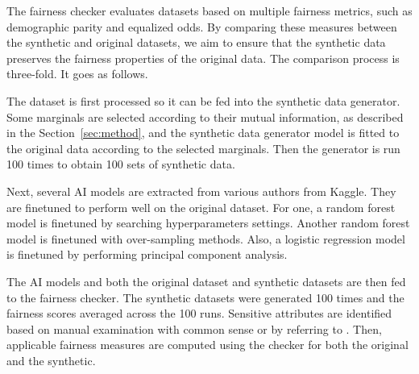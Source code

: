 \documentclass[manuscript,screen,review,anonymous]{acmart}
\begin{document}
The fairness checker evaluates datasets based on multiple fairness metrics, such as demographic parity and equalized odds. By comparing these measures between the synthetic and original datasets, we aim to ensure that the synthetic data preserves the fairness properties of the original data. The comparison process is three-fold. It goes as follows.

The dataset is first processed so it can be fed into the synthetic data generator. Some marginals are selected according to their mutual information, as described in the Section~\ref{sec:method}, and the synthetic data generator model is fitted to the original data according to the selected marginals. Then the generator is run 100 times to obtain 100 sets of synthetic data.

Next, several AI models are extracted from various authors from Kaggle. They are finetuned to perform well on the original dataset. For one, a random forest model is finetuned by searching hyperparameters settings\cite{Ipbyrne2023}. Another random forest model is finetuned with over-sampling methods\cite{Jawat2024}. Also, a logistic regression model is finetuned by performing principal component analysis\cite{Prashant1112023}.

The AI models and both the original dataset and synthetic datasets are then fed to the fairness checker. The synthetic datasets were generated 100 times and the fairness scores averaged across the 100 runs. Sensitive attributes are identified based on manual examination with common sense or by referring to \cite{pessach2022review}. Then, applicable fairness measures are computed using the checker for both the original and the synthetic.



\end{document}

